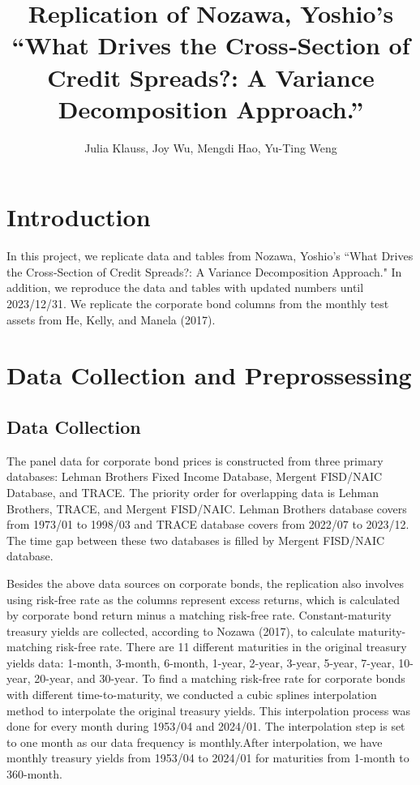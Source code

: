 \documentclass{article}
\title{Replication of Nozawa, Yoshio's “What Drives the Cross‐Section of Credit Spreads?: A Variance Decomposition Approach.”}
\author{Julia Klauss, Joy Wu, Mengdi Hao, Yu-Ting Weng}
\begin{document}
\maketitle

\section{Introduction}

In this project, we replicate data and tables from Nozawa, Yoshio's “What Drives the Cross‐Section of Credit Spreads?: A Variance Decomposition Approach." In addition, we reproduce the data and tables with updated numbers until 2023/12/31. We replicate the corporate bond columns from the monthly test assets from He, Kelly, and Manela (2017). 

\section{ Data Collection and Preprossessing}

\subsection{Data Collection}

The panel data for corporate bond prices is constructed from three primary databases: Lehman Brothers Fixed Income Database, Mergent FISD/NAIC Database, and TRACE. The priority order for overlapping data is Lehman Brothers, TRACE, and Mergent FISD/NAIC. Lehman Brothers database covers from 1973/01 to 1998/03 and TRACE database covers from 2022/07 to 2023/12. The time gap between these two databases is filled by Mergent FISD/NAIC database.

Besides the above data sources on corporate bonds, the replication also involves using risk-free rate as the columns represent excess returns, which is calculated by corporate bond return minus a matching risk-free rate. Constant-maturity treasury yields are collected, according to Nozawa (2017), to calculate maturity-matching risk-free rate. There are 11 different maturities in the original treasury yields data: 1-month, 3-month, 6-month, 1-year, 2-year, 3-year, 5-year, 7-year, 10-year, 20-year, and 30-year. To find a matching risk-free rate for corporate bonds with different time-to-maturity, we conducted a cubic splines interpolation method to interpolate the original treasury yields. This interpolation process was done for every month during 1953/04 and 2024/01. The interpolation step is set to one month as our data frequency is monthly.After interpolation, we have monthly treasury yields from 1953/04 to 2024/01 for maturities from 1-month to 360-month.
\end{document}
